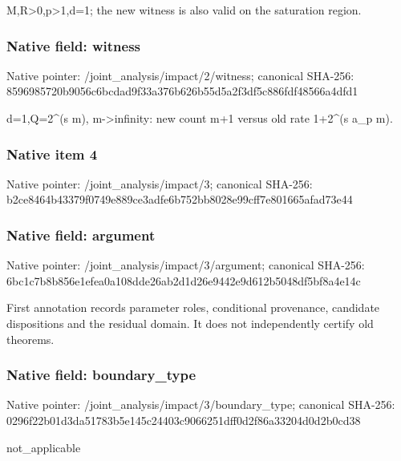 \documentclass[10pt,a4paper]{article}
\begin{document}
\begingroup\raggedright\sloppy M,\allowbreak{}R>0,\allowbreak{}p>1,\allowbreak{}d=\allowbreak{}1;\allowbreak{} the new witness is also valid on the saturation region.\par\endgroup

\subsubsection{Native field: witness}
Native pointer: /joint\_\allowbreak{}analysis/impact/2/witness; canonical SHA-256: 8596985720b9056c6bcdad9f33a376b626b55d5a2f3df5c886fdf48566a4dfd1

\begingroup\raggedright\sloppy d=\allowbreak{}1,\allowbreak{}Q=\allowbreak{}2\textasciicircum{}(s m),\allowbreak{} m->infinity:\allowbreak{} new count m+1 versus old rate 1+2\textasciicircum{}(s a\_\allowbreak{}p m).\par\endgroup

\subsubsection{Native item 4}
Native pointer: /joint\_\allowbreak{}analysis/impact/3; canonical SHA-256: b2ce8464b43379f0749e889ce3adfe6b752bb8028e99cff7e801665afad73e44

\subsubsection{Native field: argument}
Native pointer: /joint\_\allowbreak{}analysis/impact/3/argument; canonical SHA-256: 6bc1c7b8b856e1efea0a108dde26ab2d1d26e9442e9d612b5048df5bf8a4e14c

\begingroup\raggedright\sloppy First annotation records parameter roles,\allowbreak{} conditional provenance,\allowbreak{} candidate dispositions and the residual domain. It does not independently certify old theorems.\par\endgroup

\subsubsection{Native field: boundary\_\allowbreak{}type}
Native pointer: /joint\_\allowbreak{}analysis/impact/3/boundary\_\allowbreak{}type; canonical SHA-256: 0296f22b01d3da51783b5e145c24403c9066251dff0d2f86a33204d0d2b0cd38

\begingroup\raggedright\sloppy not\_\allowbreak{}applicable\par\endgroup
\end{document}
